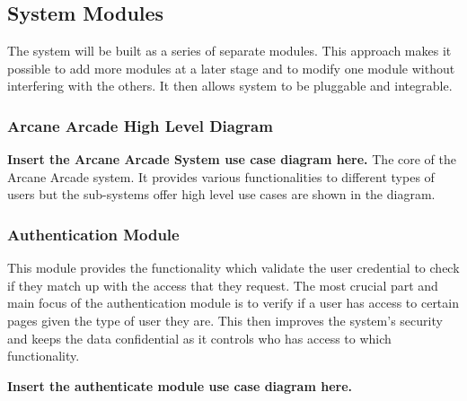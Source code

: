 \documentclass[english]{article}
\begin{document}
		\subsection{System Modules}
		The system will be built as a series of separate modules. This approach makes it possible to add more modules at a later stage and to modify one module without interfering with the others. It then allows system to be pluggable and integrable.
		\subsubsection{Arcane Arcade High Level Diagram}
		\textbf{Insert the Arcane Arcade System use case diagram here.} \newline
		The core of the Arcane Arcade system. It provides various functionalities to different types of users but the sub-systems offer high level use cases are shown in the diagram.
		\subsubsection{Authentication Module}
		This module provides the functionality which validate the user credential to check if they match up with the access that they request. The most crucial part and main focus of the authentication module is to verify if a user has access to certain pages given the type of user they are. This then improves the system's security and keeps the data confidential as it controls who has access to which functionality.
		
\textbf{Insert the authenticate module use case diagram here.} \newline
\end{document}
